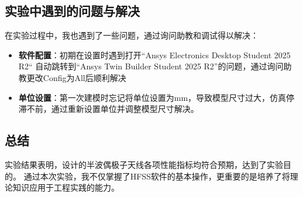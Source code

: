 \documentclass[12pt,a4paper,UTF8]{article}
\begin{document}
\subsection{\heiti\bfseries 实验中遇到的问题与解决}

在实验过程中，我也遇到了一些问题，通过询问助教和调试得以解决：

\begin{itemize}
    \item {\heiti\bfseries 软件配置}：初期在设置时遇到打开“Ansys Electronics Desktop Student 2025 R2“
自动跳转到“Ansys Twin Builder Student 2025 R2”的问题，通过询问助教更改Config为All后顺利解决
    
    \item {\heiti\bfseries 单位设置}：第一次建模时忘记将单位设置为mm，导致模型尺寸过大，仿真停滞不前，通过重新设置单位并调整模型尺寸解决。
    \end{itemize}

\subsection{\heiti\bfseries 总结}
实验结果表明，设计的半波偶极子天线各项性能指标均符合预期，达到了实验目的。
通过本次实验，我不仅掌握了HFSS软件的基本操作，更重要的是培养了将理论知识应用于工程实践的能力。
\end{document}

